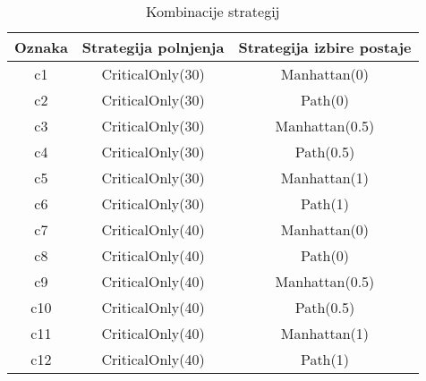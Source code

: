 \begin{table}[H]
\caption{Kombinacije strategij}
\label{tab:kombinacije_strategij}
\centering
\begin{tabular}{|c|c|c|}
\hline
Oznaka & Strategija polnjenja & Strategija izbire postaje \\
\hline
c1 & CriticalOnly(30) & Manhattan(0) \\
\hline
c2 & CriticalOnly(30) & Path(0) \\
\hline
c3 & CriticalOnly(30) & Manhattan(0.5) \\
\hline
c4 & CriticalOnly(30) & Path(0.5) \\
\hline
c5 & CriticalOnly(30) & Manhattan(1) \\
\hline
c6 & CriticalOnly(30) & Path(1) \\
\hline
c7 & CriticalOnly(40) & Manhattan(0) \\
\hline
c8 & CriticalOnly(40) & Path(0) \\
\hline
c9 & CriticalOnly(40) & Manhattan(0.5) \\
\hline
c10 & CriticalOnly(40) & Path(0.5) \\
\hline
c11 & CriticalOnly(40) & Manhattan(1) \\
\hline
c12 & CriticalOnly(40) & Path(1) \\
\hline
\end{tabular}
\end{table}
